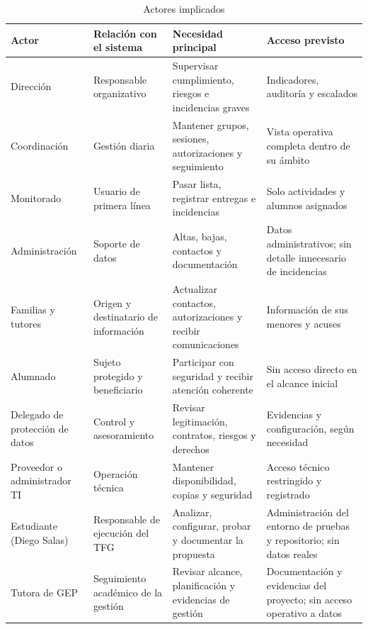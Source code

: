 \begin{table}[H]
\centering\small
\begin{tabularx}{\textwidth}{>{\hsize=0.865\hsize\raggedright\arraybackslash}X>{\hsize=0.806\hsize\raggedright\arraybackslash}X>{\hsize=1.228\hsize\raggedright\arraybackslash}X>{\hsize=1.154\hsize\raggedright\arraybackslash}X}
\toprule
\rowcolor{cabeceratabla} \textbf{Actor} & \textbf{Relación con el sistema} & \textbf{Necesidad principal} & \textbf{Acceso previsto} \\
\midrule
Dirección & Responsable organizativo & Supervisar cumplimiento, riesgos e incidencias graves & Indicadores, auditoría y escalados \\
Coordinación & Gestión diaria & Mantener grupos, sesiones, autorizaciones y seguimiento & Vista operativa completa dentro de su ámbito \\
Monitorado & Usuario de primera línea & Pasar lista, registrar entregas e incidencias & Solo actividades y alumnos asignados \\
Administración & Soporte de datos & Altas, bajas, contactos y documentación & Datos administrativos; sin detalle innecesario de incidencias \\
Familias y tutores & Origen y destinatario de información & Actualizar contactos, autorizaciones y recibir comunicaciones & Información de sus menores y acuses \\
Alumnado & Sujeto protegido y beneficiario & Participar con seguridad y recibir atención coherente & Sin acceso directo en el alcance inicial \\
Delegado de protección de datos & Control y asesoramiento & Revisar legitimación, contratos, riesgos y derechos & Evidencias y configuración, según necesidad \\
Proveedor o administrador TI & Operación técnica & Mantener disponibilidad, copias y seguridad & Acceso técnico restringido y registrado \\
Estudiante (Diego Salas) & Responsable de ejecución del TFG & Analizar, configurar, probar y documentar la propuesta & Administración del entorno de pruebas y repositorio; sin datos reales \\
Tutora de GEP & Seguimiento académico de la gestión & Revisar alcance, planificación y evidencias de gestión & Documentación y evidencias del proyecto; sin acceso operativo a datos \\
\bottomrule
\end{tabularx}
\caption{Actores implicados}\label{tab:1}
\end{table}

